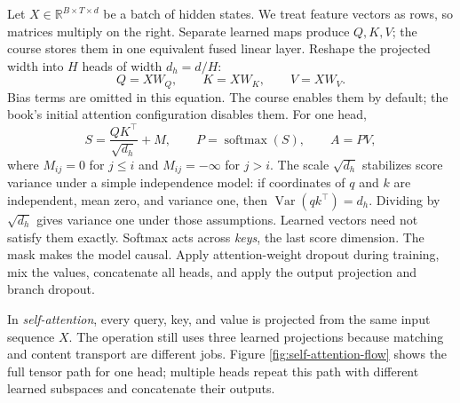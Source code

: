 \documentclass[11pt]{article}
\newcommand{\softmax}{\operatorname{softmax}}
\begin{document}
Let $X\in\mathbb R^{B\times T\times d}$ be a batch of hidden states. We treat
feature vectors as rows, so matrices multiply on the right. Separate learned
maps produce $Q,K,V$; the course stores them in one equivalent fused linear
layer. Reshape the projected width into $H$ heads of width $d_h=d/H$:
\[
Q=XW_Q,\qquad K=XW_K,\qquad V=XW_V.
\]
Bias terms are omitted in this equation. The course enables them by default;
the book's initial attention configuration disables them.
For one head,
\[
S=\frac{QK^\top}{\sqrt{d_h}}+M,\qquad
P=\softmax(S),\qquad A=PV,
\]
where $M_{ij}=0$ for $j\le i$ and $M_{ij}=-\infty$ for $j>i$. The scale
$\sqrt{d_h}$ stabilizes score variance under a simple independence model:
if coordinates of $q$ and $k$ are independent, mean zero, and variance one,
then $\operatorname{Var}(qk^\top)=d_h$. Dividing by $\sqrt{d_h}$ gives variance
one under those assumptions. Learned vectors need not satisfy them exactly.
Softmax acts across \emph{keys}, the last score dimension. The mask makes the
model causal. Apply attention-weight dropout during training, mix the values,
concatenate all heads, and apply the output projection and branch dropout.

In \emph{self-attention}, every query, key, and value is projected from the same
input sequence $X$. The operation still uses three learned projections because
matching and content transport are different jobs. Figure
\ref{fig:self-attention-flow} shows the full tensor path for one head; multiple
heads repeat this path with different learned subspaces and concatenate their
outputs.
\end{document}
